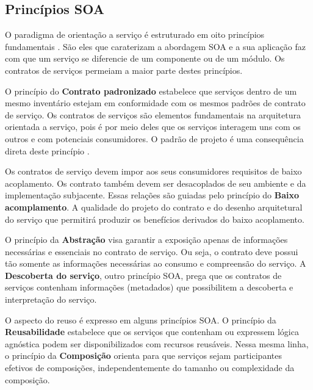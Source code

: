 \subsection{Princípios SOA}


O paradigma de orientação a serviço é estruturado em oito princípios
fundamentais \cite{erl2009web}. São eles que
caraterizam a abordagem SOA e a sua aplicação faz com que um serviço se diferencie de um componente ou de
um módulo. Os contratos de serviços permeiam a maior parte destes princípios.

O princípio do \textbf{Contrato padronizado} estabelece que serviços
dentro de um mesmo inventário estejam em conformidade com os mesmos padrões de
contrato de serviço.
Os contratos de serviços são elementos fundamentais na arquitetura orientada a
serviço, pois é por meio deles que os serviços interagem uns com os outros e com
potenciais consumidores. O padrão de projeto \CtFirst{} é uma
consequência direta deste princípio \cite{erl2009web}.

Os contratos de serviço devem impor aos seus consumidores requisitos de baixo
acoplamento. Os contrato também devem ser desacoplados de seu ambiente e da
implementação subjacente.
Essas relações são guiadas pelo princípio do \textbf{Baixo acomplamento}. A
qualidade do projeto do contrato e do desenho arquitetural do serviço que
permitirá produzir os benefícios derivados do baixo acoplamento.

% 

O princípio da \textbf{Abstração} visa garantir a exposição apenas de
informações necessárias e essenciais no contrato de serviço. Ou seja, o contrato deve possui tão somente
as informações necessárias ao consumo e compreensão do serviço. A
\textbf{Descoberta do serviço}, outro princípio SOA, prega que os contratos de
serviços contenham informações (metadados) que possibilitem a descoberta e
interpretação do serviço.

O aspecto do reuso é expresso em alguns princípios SOA. O princípio da
\textbf{Reusabilidade} estabelece que os serviços que contenham ou expressem
lógica agnóstica podem ser disponibilizados com recursos reusáveis. Nessa mesma
linha, o princípio da \textbf{Composição} orienta para que serviços sejam
participantes efetivos de composições, independentemente do tamanho ou
complexidade da composição.

